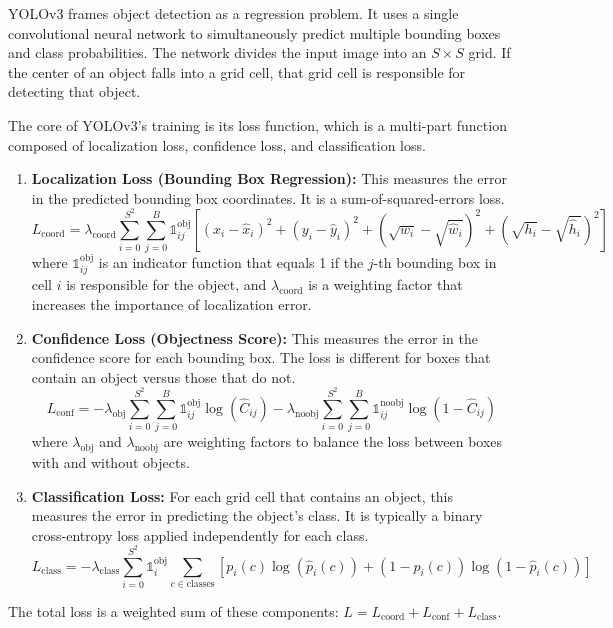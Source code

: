 \documentclass{article}
\begin{document}
YOLOv3 frames object detection as a regression problem. It uses a single convolutional neural network to simultaneously predict multiple bounding boxes and class probabilities. The network divides the input image into an $S \times S$ grid. If the center of an object falls into a grid cell, that grid cell is responsible for detecting that object.

The core of YOLOv3's training is its loss function, which is a multi-part function composed of localization loss, confidence loss, and classification loss.

\begin{enumerate}
    \item \textbf{Localization Loss (Bounding Box Regression):} This measures the error in the predicted bounding box coordinates. It is a sum-of-squared-errors loss.
    \begin{equation}
    L_{\text{coord}} = \lambda_{\text{coord}} \sum_{i=0}^{S^2} \sum_{j=0}^{B} \mathbb{1}_{ij}^{\text{obj}} \left[ (x_i - \hat{x}_i)^2 + (y_i - \hat{y}_i)^2 + (\sqrt{w_i} - \sqrt{\hat{w}_i})^2 + (\sqrt{h_i} - \sqrt{\hat{h}_i})^2 \right]
    \end{equation}
    where $\mathbb{1}_{ij}^{\text{obj}}$ is an indicator function that equals 1 if the $j$-th bounding box in cell $i$ is responsible for the object, and $\lambda_{\text{coord}}$ is a weighting factor that increases the importance of localization error.

    \item \textbf{Confidence Loss (Objectness Score):} This measures the error in the confidence score for each bounding box. The loss is different for boxes that contain an object versus those that do not.
    \begin{equation}
    L_{\text{conf}} = -\lambda_{\text{obj}} \sum_{i=0}^{S^2} \sum_{j=0}^{B} \mathbb{1}_{ij}^{\text{obj}} \log(\hat{C}_{ij}) - \lambda_{\text{noobj}} \sum_{i=0}^{S^2} \sum_{j=0}^{B} \mathbb{1}_{ij}^{\text{noobj}} \log(1 - \hat{C}_{ij})
    \end{equation}
    where $\lambda_{\text{obj}}$ and $\lambda_{\text{noobj}}$ are weighting factors to balance the loss between boxes with and without objects.

    \item \textbf{Classification Loss:} For each grid cell that contains an object, this measures the error in predicting the object's class. It is typically a binary cross-entropy loss applied independently for each class.
    \begin{equation}
    L_{\text{class}} = -\lambda_{\text{class}} \sum_{i=0}^{S^2} \mathbb{1}_{i}^{\text{obj}} \sum_{c \in \text{classes}} \left[ p_i(c) \log(\hat{p}_i(c)) + (1-p_i(c))\log(1-\hat{p}_i(c)) \right]
    \end{equation}
\end{enumerate}
The total loss is a weighted sum of these components: $L = L_{\text{coord}} + L_{\text{conf}} + L_{\text{class}}$.
\end{document}
